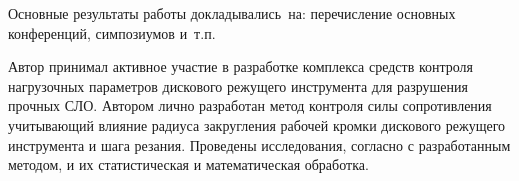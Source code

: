 {\probation}
Основные результаты работы докладывались~на:
перечисление основных конференций, симпозиумов и~т.\:п.

{\contribution} Автор принимал активное участие в разработке комплекса средств контроля нагрузочных параметров дискового режущего инструмента для разрушения прочных СЛО. Автором лично разработан метод контроля силы сопротивления учитывающий влияние радиуса закругления рабочей кромки дискового режущего инструмента и шага резания. Проведены исследования, согласно с разработанным методом, и их статистическая и математическая обработка.  


